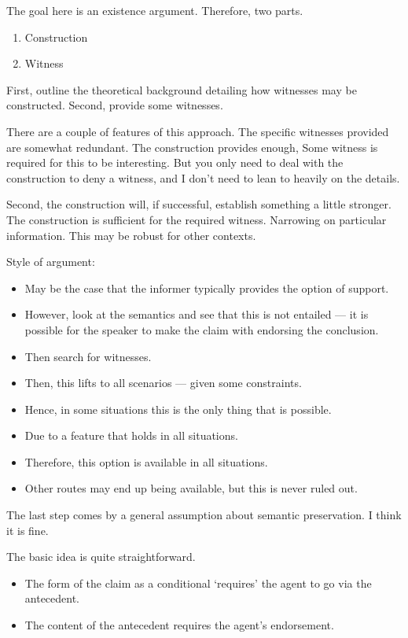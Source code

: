 \documentclass[10pt]{article}
\begin{document}
\newpage

\begin{note}
  The goal here is an existence argument.
  Therefore, two parts.
  \begin{enumerate}
  \item Construction
  \item Witness
  \end{enumerate}
  First, outline the theoretical background detailing how witnesses may be constructed.
  Second, provide some witnesses.

  There are a couple of features of this approach.
  The specific witnesses provided are somewhat redundant.
  The construction provides enough,
  Some witness is required for this to be interesting.
  But you only need to deal with the construction to deny a witness, and I don't need to lean to heavily on the details.

  Second, the construction will, if successful, establish something a little stronger.
  The construction is sufficient for the required witness.
  Narrowing on particular information.
  This may be robust for other contexts.

  Style of argument:
  \begin{itemize}
  \item May be the case that the informer typically provides the option of support.
  \item However, look at the semantics and see that this is not entailed --- it is possible for the speaker to make the claim with endorsing the conclusion.
  \item Then search for witnesses.
  \item Then, this lifts to all scenarios --- given some constraints.
  \item Hence, in some situations this is the only thing that is possible.
  \item Due to a feature that holds in all situations.
  \item Therefore, this option is available in all situations.
  \item Other routes may end up being available, but this is never ruled out.
  \end{itemize}
  The last step comes by a general assumption about semantic preservation.
  I think it is fine.
\end{note}

\begin{note}
  The basic idea is quite straightforward.
  \begin{itemize}
  \item The form of the claim as a conditional `requires' the agent to go via the antecedent.
  \item The content of the antecedent requires the agent's endorsement.
  \end{itemize}
\end{note}
\end{document}
